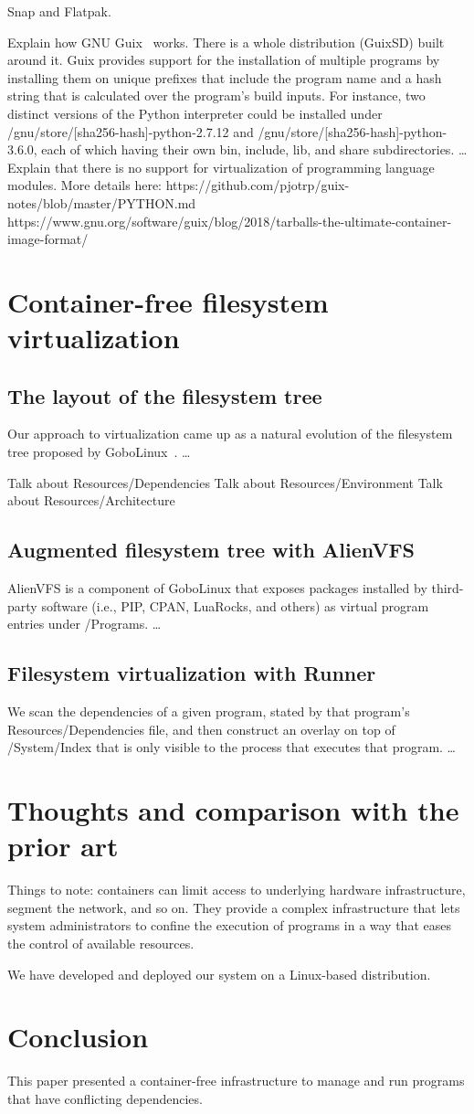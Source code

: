 \documentclass[sigplan, anonymous]{acmart}
\begin{document}
Snap and Flatpak.

Explain how GNU Guix~\cite{Guix} works. There is a whole distribution (GuixSD) built around it.
Guix provides support for the installation of multiple programs by installing them on unique
prefixes that include the program name and a hash string that is calculated over the program's
build inputs. For instance, two distinct versions of the Python interpreter could be installed
under /gnu/store/[sha256-hash]-python-2.7.12 and /gnu/store/[sha256-hash]-python-3.6.0, each
of which having their own bin, include, lib, and share subdirectories. \ldots
Explain that there is no support for virtualization of programming language modules. More details
here: https://github.com/pjotrp/guix-notes/blob/master/PYTHON.md
https://www.gnu.org/software/guix/blog/2018/tarballs-the-ultimate-container-image-format/


\section{Container-free filesystem virtualization}

\subsection{The layout of the filesystem tree}
Our approach to virtualization came up as a natural evolution of the filesystem tree proposed
by GoboLinux~\cite{GoboLinux}. \ldots

Talk about Resources/Dependencies
Talk about Resources/Environment
Talk about Resources/Architecture

\subsection{Augmented filesystem tree with AlienVFS}
AlienVFS is a component of GoboLinux that exposes packages installed by third-party software
(i.e., PIP, CPAN, LuaRocks, and others) as virtual program entries under /Programs. \ldots

\subsection{Filesystem virtualization with Runner}
We scan the dependencies of a given program, stated by that program's Resources/Dependencies
file, and then construct an overlay on top of /System/Index that is only visible to the process
that executes that program. \ldots


\section{Thoughts and comparison with the prior art}
Things to note: containers can limit access to underlying hardware infrastructure, segment the
network, and so on. They provide a complex infrastructure that lets system administrators to
confine the execution of programs in a way that eases the control of available resources.

We have developed and deployed our system on a Linux-based distribution.

\section{Conclusion}
This paper presented a container-free infrastructure to manage and run programs that have
conflicting dependencies. 



\end{document}
